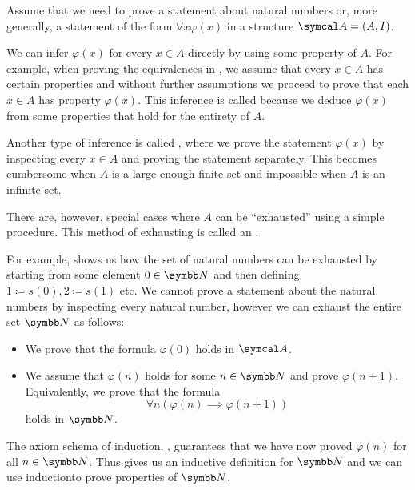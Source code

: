 \begin{remark}\label{remark:induction\IND}
  Assume that we need to prove a statement about natural numbers or, more generally, a statement of the form \( \forall x \varphi(x) \) in a structure \( \Cal{A} = (A, I) \).

  We can infer \( \varphi(x) \) for every \( x \in A \) directly by using some property of \( A \). For example, when proving the equivalences in , we assume that every \( x \in A \) has certain properties and without further assumptions we proceed to prove that each \( x \in A \) has property \( \varphi(x) \). This inference is called  because we deduce \( \varphi(x) \) from some properties that hold for the entirety of \( A \).

  Another type of inference is called , where we prove the statement \( \varphi(x) \) by inspecting every \( x \in A \) and proving the statement separately. This becomes cumbersome when \( A \) is a large enough finite set and impossible when \( A \) is an infinite set.

  There are, however, special cases where \( A \) can be \enquote{exhausted} using a simple procedure. This method of exhausting is called an .

  For example,  shows us how the set of natural numbers can be exhausted by starting from some element \( 0 \in \BN \) and then defining \( 1 \coloneqq s(0), 2 \coloneqq s(1) \) etc. We cannot prove a statement about the natural numbers by inspecting every natural number, however we can exhaust the entire set \( \BN \) as follows:
  \begin{itemize}
    \item We prove that the formula \( \varphi(0) \) holds in \( \Cal{A} \).
    \item We assume that \( \varphi(n) \) holds for some \( n \in \BN \) and prove \( \varphi(n + 1) \). Equivalently, we prove that the formula
    \begin{equation*}
      \forall n (\varphi(n) \implies \varphi(n + 1))
    \end{equation*}
    holds in \( \BN \).
  \end{itemize}

  The axiom schema of induction\IND, , guarantees that we have now proved \( \varphi(n) \) for all \( n \in \BN \). Thus  gives us an inductive definition for \( \BN \) and we can use induction\IND to prove properties of \( \BN \).


\end{remark}
